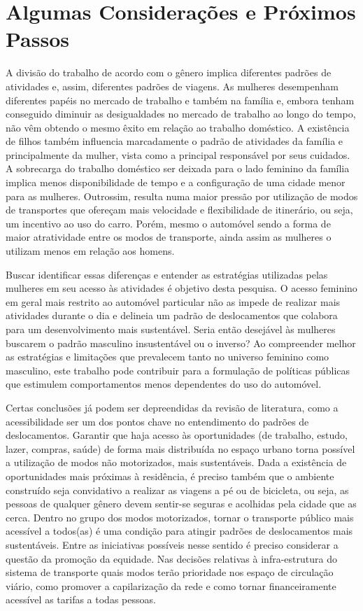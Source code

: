 \chapter{Algumas Considerações e Próximos Passos}\label{chap:considfinais}

A divisão do trabalho de acordo com o gênero implica diferentes padrões de atividades e, assim, diferentes padrões de viagens. As mulheres desempenham diferentes papéis no mercado de trabalho e também na família e, embora tenham conseguido diminuir as desigualdades no mercado de trabalho ao longo do tempo, não vêm obtendo o mesmo êxito em relação ao trabalho doméstico. A existência de filhos também influencia marcadamente o padrão de atividades da família e principalmente da mulher, vista como a principal responsável por seus cuidados. A sobrecarga do trabalho doméstico ser deixada para o lado feminino da família implica menos disponibilidade de tempo e a configuração de uma cidade menor para as mulheres. Outrossim, resulta numa maior pressão por utilização de modos de transportes que ofereçam mais velocidade e flexibilidade de itinerário, ou seja, um incentivo ao uso do carro.
Porém, mesmo o automóvel sendo a forma de maior atratividade entre os modos de transporte, ainda assim as mulheres o utilizam menos em relação aos homens.

Buscar identificar essas diferenças e entender as estratégias utilizadas pelas mulheres em seu acesso às atividades é objetivo desta pesquisa. O acesso feminino em geral mais restrito ao automóvel particular não as impede de realizar mais atividades durante o dia e delineia um padrão de deslocamentos que colabora para um desenvolvimento mais sustentável. Seria então desejável às mulheres buscarem o padrão masculino insustentável ou o inverso? Ao compreender melhor as estratégias e limitações que prevalecem tanto no universo feminino como masculino, este trabalho pode contribuir para a formulação de políticas públicas que estimulem comportamentos menos dependentes do uso do automóvel.

Certas conclusões já podem ser depreendidas da revisão de literatura, como a acessibilidade ser um dos pontos chave no entendimento do padrões de deslocamentos. Garantir que haja acesso às oportunidades (de trabalho, estudo, lazer, compras, saúde) de forma mais distribuída no espaço urbano torna possível a utilização de modos não motorizados, mais sustentáveis. Dada a existência de oportunidades mais próximas à residência, é preciso também que o ambiente construído seja convidativo a realizar as viagens a pé ou de bicicleta, ou seja, as pessoas de qualquer gênero devem sentir-se seguras e acolhidas pela cidade que as cerca. 
Dentro no grupo dos modos motorizados, tornar o transporte público mais acessível a todos(as) é uma condição para atingir padrões de deslocamentos mais sustentáveis. Entre as iniciativas possíveis nesse sentido é preciso considerar a questão da promoção da equidade. Nas decisões relativas à infra-estrutura do sistema de transporte quais modos terão prioridade nos espaço de circulação viário, como promover a capilarização da rede e como tornar financeiramente acessível as tarifas a todas pessoas.


